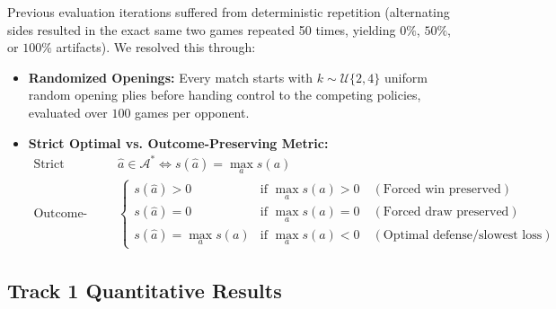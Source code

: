\documentclass[11pt,a4paper]{article}
\begin{document}
Previous evaluation iterations suffered from deterministic repetition (alternating sides resulted in the exact same two games repeated 50 times, yielding $0\%$, $50\%$, or $100\%$ artifacts). We resolved this through:
\begin{itemize}[leftmargin=1.2cm]
    \item \textbf{Randomized Openings:} Every match starts with $k \sim \mathcal{U}\{2, 4\}$ uniform random opening plies before handing control to the competing policies, evaluated over $100$ games per opponent.
    \item \textbf{Strict Optimal vs. Outcome-Preserving Metric:}
    \begin{align*}
        \text{Strict Optimal:} \quad & \hat{a} \in \mathcal{A}^* \iff s(\hat{a}) = \max_{a} s(a) \\
        \text{Outcome-Preserving:} \quad & \begin{cases}
            s(\hat{a}) > 0 & \text{if } \max_a s(a) > 0 \quad (\text{Forced win preserved}) \\
            s(\hat{a}) = 0 & \text{if } \max_a s(a) = 0 \quad (\text{Forced draw preserved}) \\
            s(\hat{a}) = \max_a s(a) & \text{if } \max_a s(a) < 0 \quad (\text{Optimal defense/slowest loss})
        \end{cases}
    \end{align*}
\end{itemize}

\subsection{Track 1 Quantitative Results}
\end{document}
